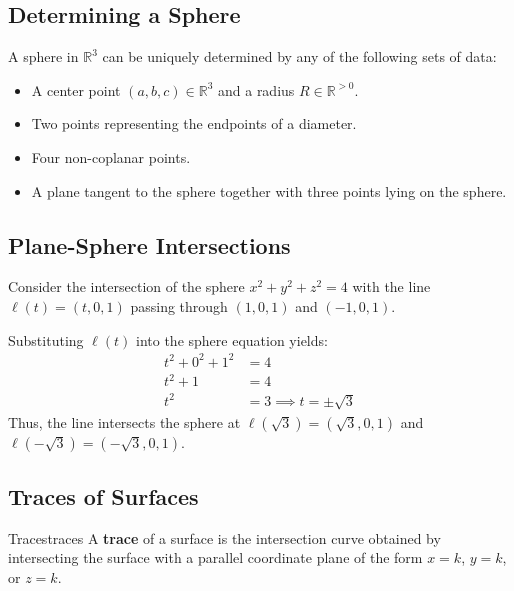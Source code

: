\subsection{Determining a Sphere}
A sphere in $\mathbb{R}^3$ can be uniquely determined by any of the following sets of data:
\begin{itemize}
    \item A center point $(a,b,c) \in \mathbb{R}^3$ and a radius $R \in \mathbb{R}^{>0}$.
    \item Two points representing the endpoints of a diameter.
    \item Four non-coplanar points.
    \item A plane tangent to the sphere together with three points lying on the sphere.
\end{itemize}

\subsection{Plane-Sphere Intersections}

\begin{example}
Consider the intersection of the sphere $x^2 + y^2 + z^2 = 4$ with the line $\ell(t) = (t, 0, 1)$ passing through $(1, 0, 1)$ and $(-1, 0, 1)$.

Substituting $\ell(t)$ into the sphere equation yields:
\begin{align*}
    t^2 + 0^2 + 1^2 &= 4 \\
    t^2 + 1 &= 4 \\
    t^2 &= 3 \implies t = \pm \sqrt{3}
\end{align*}
Thus, the line intersects the sphere at $\ell(\sqrt{3}) = (\sqrt{3}, 0, 1)$ and $\ell(-\sqrt{3}) = (-\sqrt{3}, 0, 1)$.
\end{example}


\subsection{Traces of Surfaces}

\begin{definition}{Traces}{traces}
A \textbf{trace} of a surface is the intersection curve obtained by intersecting the surface with a parallel coordinate plane of the form $x = k$, $y = k$, or $z = k$.
\end{definition}


